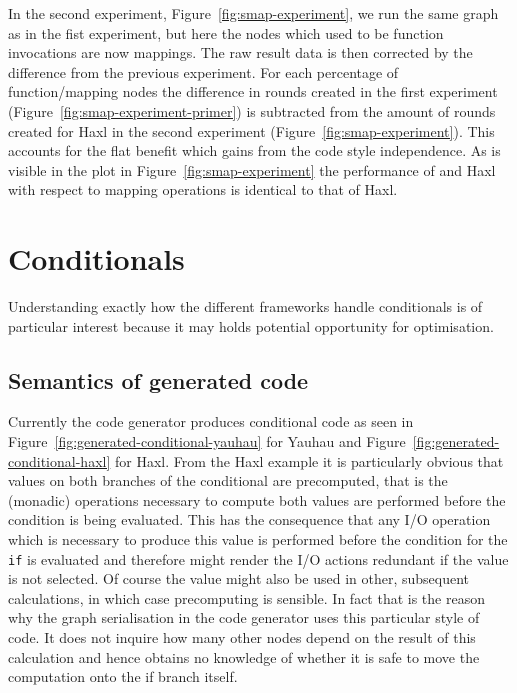 In the second experiment, Figure~\ref{fig:smap-experiment}, we run the same graph as in the fist experiment, but here the nodes which used to be function invocations are now mappings.
The raw result data is then corrected by the difference from the previous experiment.
For each percentage of function/mapping nodes the difference in rounds created in the first experiment (Figure~\ref{fig:smap-experiment-primer}) is subtracted from the amount of rounds created for Haxl in the second experiment (Figure~\ref{fig:smap-experiment}).
This accounts for the flat benefit which \yauhau{} gains from the code style independence.
As is visible in the plot in Figure~\ref{fig:smap-experiment} the performance of \yauhau{} and Haxl with respect to mapping operations is identical to that of Haxl.

\section{Conditionals}

Understanding exactly how the different frameworks handle conditionals is of particular interest because it may holds potential opportunity for optimisation.

\subsection{Semantics of generated code}

Currently the code generator produces conditional code as seen in Figure~\ref{fig:generated-conditional-yauhau} for Yauhau and Figure~\ref{fig:generated-conditional-haxl} for Haxl.
From the Haxl example it is particularly obvious that values on both branches of the conditional are precomputed, that is the (monadic) operations necessary to compute both values are performed before the condition is being evaluated.
This has the consequence that any I/O operation which is necessary to produce this value is performed before the condition for the \texttt{if} is evaluated and therefore might render the I/O actions redundant if the value is not selected.
Of course the value might also be used in other, subsequent calculations, in which case precomputing is sensible.
In fact that is the reason why the graph serialisation in the code generator uses this particular style of code.
It does not inquire how many other nodes depend on the result of this calculation and hence obtains no knowledge of whether it is safe to move the computation onto the if branch itself.

